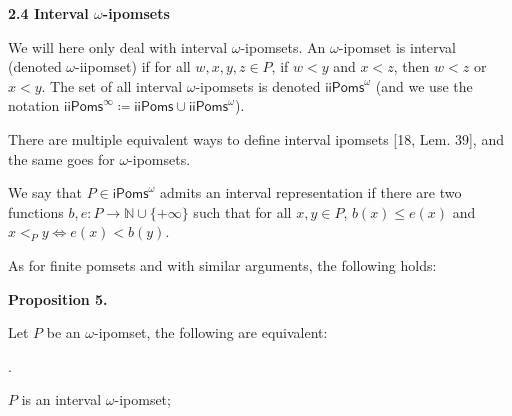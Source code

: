  
\par\medskip\noindent\textbf{2.4 Interval $\omega$-ipomsets}\par
 
 
We will here only deal with interval $\omega$-ipomsets. An $\omega$-ipomset is interval (denoted $\omega$-iipomset) if for all $w,x,y,z\in P$, if $w<y$ and $x<z$, then $w<z$ or $x<y$. The set of all interval $\omega$-ipomsets is denoted ${\mathsf{iiPoms}^{\omega}}$ (and we use the notation ${\mathsf{iiPoms}^{\infty}}\coloneqq\mathsf{iiPoms}\cup{\mathsf{iiPoms}^{\omega}}$).\par
 
 
 
There are multiple equivalent ways to define interval ipomsets [18, Lem. 39], and the same goes for $\omega$-ipomsets.\par
 
 
 
We say that $P\in{\mathsf{iPoms}^{\omega}}$ admits an interval representation if there are two functions ${b,e:P\rightarrow\mathbb{N}\cup{\{+\infty\}}}$ such that for all $x,y\in P$, $b(x)\leqslant e(x)$ and $x<_{P}y\Leftrightarrow e(x)<b(y)$.\par
 
 
 
As for finite pomsets and with similar arguments, the following holds:\par
 
 
 
\par\medskip\noindent\textbf{Proposition 5.}\par
 
 
Let $P$ be an $\omega$-ipomset, the following are equivalent:\par
  
\par{}. 
 
$P$ is an interval $\omega$-ipomset;\par
 
 
